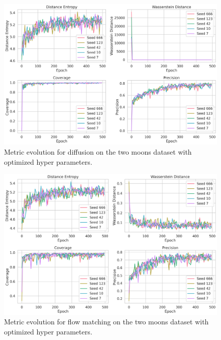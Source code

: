 \documentclass{article}
\begin{document}
\begin{figure}[tb]
    \includegraphics[width=\linewidth]{images/multiseed/diffusion_two_moons_metrics_comparison_optimized}
    \caption{Metric evolution for diffusion on the two moons dataset with optimized hyper parameters.}
    \label{fig:diffusion_two_moons_metrics_comparison_optimized}
\end{figure}

\begin{figure}[tb]
    \includegraphics[width=\linewidth]{images/multiseed/flow_matching_two_moons_metrics_comparison_optimized}
    \caption{Metric evolution for flow matching on the two moons dataset with optimized hyper parameters.}
    \label{fig:flow_matching_two_moons_metrics_comparison_optimized}
\end{figure}
\end{document}
